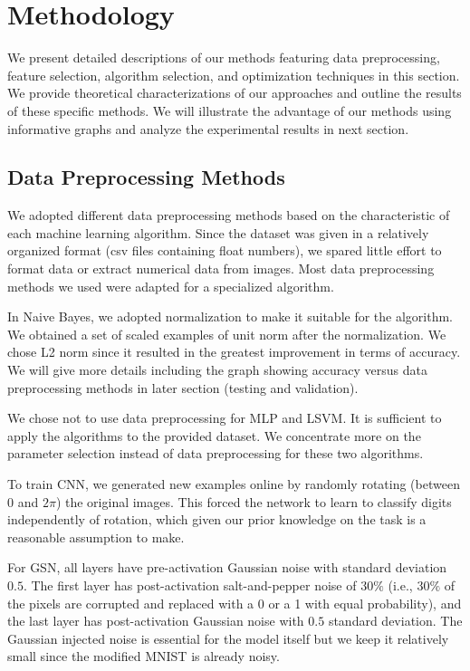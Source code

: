 \documentclass{acm_proc_article-sp}
\begin{document}
\section{Methodology}
We present detailed descriptions of our methods featuring data preprocessing, feature selection, algorithm selection, and optimization techniques in this section.  We provide theoretical characterizations of our approaches and outline the results of these specific methods. We will illustrate the advantage of our methods using informative graphs and analyze the experimental results in next section.


\subsection{Data Preprocessing Methods}
We adopted different data preprocessing methods based on the characteristic of each machine learning algorithm. Since the dataset was given in a relatively organized format (csv files containing float numbers), we spared little effort to format data or extract numerical data from images. Most data preprocessing methods we used were adapted for a specialized algorithm.

In Naive Bayes, we adopted normalization to  make it suitable for the algorithm. We obtained a set of scaled examples of unit norm after the normalization. We chose L2 norm since it resulted in the greatest improvement in terms of accuracy. We will give more details including the graph showing accuracy versus data preprocessing methods in later section (testing and validation).

We chose not to use data preprocessing for MLP and LSVM. It is sufficient to apply the algorithms to the provided dataset. We concentrate more on the parameter selection instead of data preprocessing for these two algorithms.

To train CNN, we generated new examples online by randomly rotating (between 0 and $2\pi$) the original images. This forced the network to learn to classify digits independently of rotation, which given our prior knowledge on the task is a reasonable assumption to make.

For GSN, all layers have pre-activation Gaussian noise with standard deviation $0.5$. The first layer has post-activation salt-and-pepper noise of $30\%$ (i.e., $30\%$ of the pixels are corrupted and replaced with a 0 or a 1 with equal probability), and the last layer has post-activation Gaussian noise with $0.5$ standard deviation. The Gaussian injected noise is essential for the model itself but we keep it relatively small since the modified MNIST is already noisy. 
\end{document}
